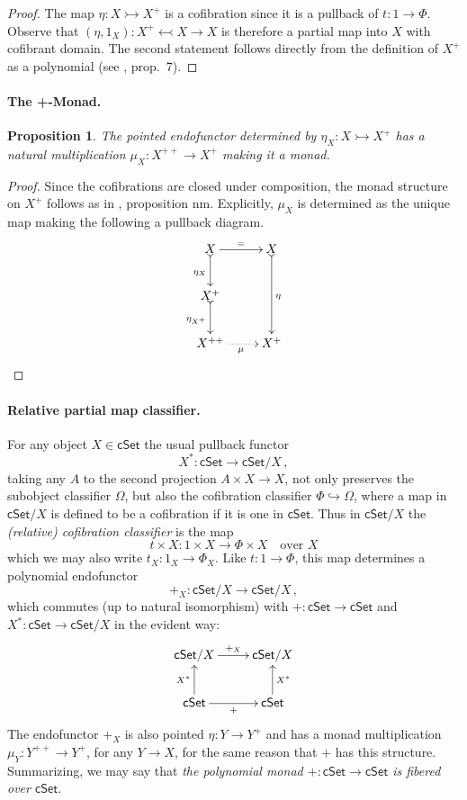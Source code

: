 \documentclass[12pt]{article}
\newcommand{\cSet}{\ensuremath{\mathsf{cSet}}}
\newcommand{\hook}{\ensuremath{\hookrightarrow}}
\newcommand{\mono}{\ensuremath{\rightarrowtail}}
\newcommand{\ra}{\ensuremath{\rightarrow}}
\newtheorem{proposition}[theorem]{Proposition}
\theoremstyle{remark}
\theoremstyle{definition}
\begin{document}
\begin{proof}
The map $\eta : X\mono X^+$ is a cofibration since it is a pullback of $t : 1\ra \Phi$. Observe that $(\eta, 1_X) : X^+\leftarrowtail X\ra X$ is therefore a partial map into $X$ with cofibrant domain. The second statement follows directly from the definition of $X^+$ as a polynomial (see \cite{A:NM}, prop.~7). 
\end{proof}

\paragraph{The +-Monad.}

\begin{proposition}
The pointed endofunctor determined by $\eta_X : X\mono X^+$ has a natural multiplication $\mu_X : X^{++} \ra X^+$ making it a monad.
\end{proposition}

\begin{proof}
Since the cofibrations are closed under composition, the monad structure on $X^+$ follows as in \cite{AN}, proposition nm.  Explicitly, $\mu_X$ is determined as the unique map making the following a pullback diagram.
\[
\xymatrix{
X \ar@{>->}[d]_{\eta_X} \ar[r]^= & X \ar@{>->}[dd]^{\eta}\\
X^+ \ar@{>->}[d]_{\eta_{X^+}} & \\
X^{++} \ar@{.>}[r]_\mu & X^+
}
\]
\end{proof}

\paragraph{Relative partial map classifier.}

For any object $X\in\cSet$ the usual pullback functor $$X^* : \cSet \ra \cSet/X\,,$$ taking any $A$ to the second projection $A\times X\ra X$, not only preserves the subobject classifier $\Omega$, but also the cofibration classifier $\Phi \hook \Omega$, where a map in $\cSet/X$ is defined to be a cofibration if it is one in \cSet. Thus in $\cSet/X$ the \emph{(relative) cofibration classifier} is the map
\[
t \times X : 1\times X \ra \Phi\times X	\quad\text{over $X$}
\]
which we may also write $t_X : 1_X \ra \Phi_X$.  Like $t : 1\ra \Phi$, this map determines a polynomial endofunctor  $$+_X : \cSet/X \ra \cSet/X\,,$$ which commutes (up to natural isomorphism) with $+ : \cSet \ra \cSet$ and $X^* : \cSet \ra \cSet/X$ in the evident way:
\begin{equation}\label{diag:+fibered}
\xymatrix{
\cSet/X \ar[r]^{+_X}& \cSet/X \\
\cSet \ar[u]^{X^*} \ar[r]_+ & \ar[u]_{X^*}\cSet 
}
\end{equation}
The endofunctor $+_X$ is also pointed $\eta : Y \ra Y^+$ and has a monad multiplication $\mu_Y : Y^{++} \ra Y^+$, for any $Y\ra X$, for the same reason that $+$ has this structure.  Summarizing, we may say that \emph{the polynomial monad $+ : \cSet \ra \cSet$ is fibered over \cSet}.
\end{document}
